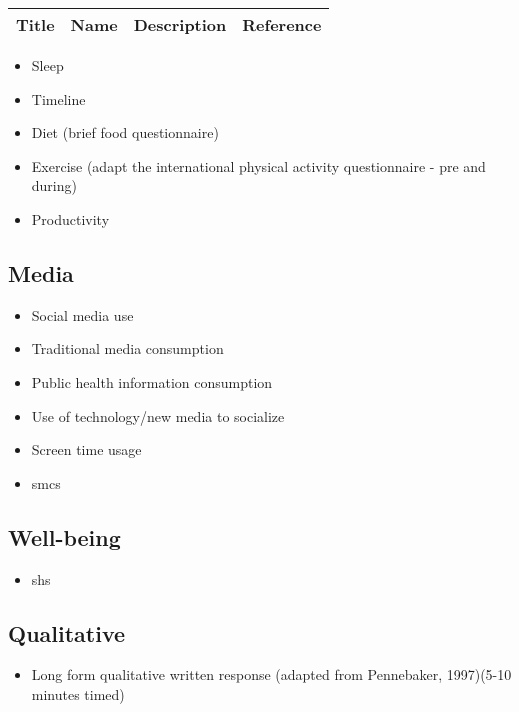 \documentclass[]{book}
\providecommand{\tightlist}{%
  \setlength{\itemsep}{0pt}\setlength{\parskip}{0pt}}
\begin{document}
\begin{longtable}[]{@{}llll@{}}
\toprule
Title & Name & Description & Reference\tabularnewline
\midrule
\endhead
\bottomrule
\end{longtable}

\begin{itemize}
\tightlist
\item
  Sleep
\item
  Timeline
\item
  Diet (brief food questionnaire)
\item
  Exercise (adapt the international physical activity questionnaire - pre and during)
\item
  Productivity
\end{itemize}

\hypertarget{media}{%
\subsection{Media}\label{media}}

\begin{itemize}
\tightlist
\item
  Social media use
\item
  Traditional media consumption
\item
  Public health information consumption
\item
  Use of technology/new media to socialize
\item
  Screen time usage
\item
  smcs
\end{itemize}

\hypertarget{well-being}{%
\subsection{Well-being}\label{well-being}}

\begin{itemize}
\tightlist
\item
  shs
\end{itemize}

\hypertarget{qualitative}{%
\subsection{Qualitative}\label{qualitative}}

\begin{itemize}
\tightlist
\item
  Long form qualitative written response (adapted from Pennebaker, 1997)(5-10 minutes timed)
\end{itemize}
\end{document}

